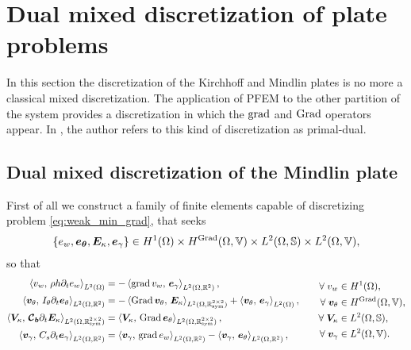 \section{Dual mixed discretization of plate problems}\label{sec:dual_mixed}
In this section the discretization of the Kirchhoff and Mindlin plates is no more a classical mixed discretization. The application of PFEM to the other partition of the system provides a discretization in which the $\grad$ and $\Grad$ operators appear. In \cite{joly2003variational}, the author refers to this kind of discretization as primal-dual.

\subsection{Dual mixed discretization of the Mindlin plate}
First of all we construct a family of finite elements capable of discretizing problem \eqref{eq:weak_min_grad}, that seeks
$$\{e_w, \bm{e}_{\bm{\theta}}, \bm{E}_{\kappa}, \bm{e}_{\gamma}\} \in H^{1}(\Omega) \times H^{\Grad}(\Omega, \mathbb{V}) \times L^2(\Omega, \mathbb{S}) \times L^2(\Omega, \mathbb{V}), $$
so that 
\begin{equation}\label{eq:weak_min_grad_nobd}
\begin{aligned}
\inner[L^2(\Omega)]{v_w}{\rho h \partial_t e_w} &= -\inner[L^2(\Omega, \mathbb{R}^{2})]{\grad v_w}{\bm{e}_\gamma}, \\
\inner[L^2(\Omega, \mathbb{R}^{2})]{\bm{v}_\theta}{I_\theta \partial_t \bm{e}_\theta} &= -\inner[L^2(\Omega, \mathbb{R}^{2\times 2}_{\text{sym}})]{\Grad \bm{v}_\theta}{\bm{E}_\kappa} + \inner[L^2(\Omega)]{\bm{v}_\theta}{\bm{e}_\gamma}, \\
\inner[L^2(\Omega, \mathbb{R}^{2\times 2}_{\text{sym}})]{\bm{V}_\kappa}{\bm{\mathcal{C}_b} \partial_t \bm{E}_\kappa} &= \inner[L^2(\Omega, \mathbb{R}^{2\times 2}_{\text{sym}})]{\bm{V}_\kappa}{\Grad \bm{e}_\theta}, \\
\inner[L^2(\Omega, \mathbb{R}^{2})]{\bm{v}_\gamma}{C_s \partial_t \bm{e}_\gamma} &= \inner[L^2(\Omega, \mathbb{R}^{2})]{\bm{v}_\gamma}{\grad e_w} - \inner[L^2(\Omega, \mathbb{R}^{2})]{\bm{v}_\gamma}{\bm{e}_\theta}, \\
\end{aligned} \qquad
\begin{aligned}
\forall\; v_w &\in H^{1}(\Omega), \\
\forall\; \bm{v}_\theta &\in H^{\Grad}(\Omega, \mathbb{V}), \\
\forall\; \bm{V}_\kappa &\in L^2(\Omega, \mathbb{S}), \\
\forall\; \bm{v}_\gamma &\in L^2(\Omega, \mathbb{V}).
\end{aligned}
\end{equation}

